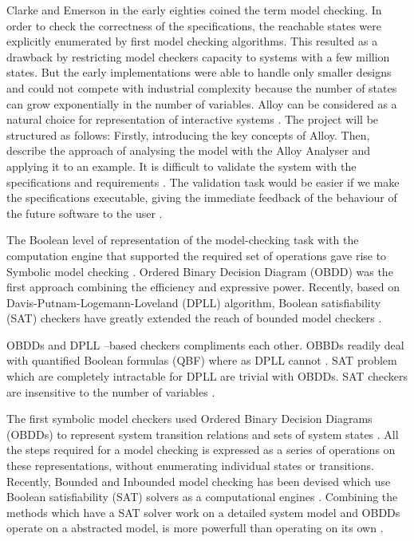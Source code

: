\documentclass[a4paper,12pt]{report}
\begin{document}
\begin{onehalfspacing}
Clarke and Emerson in the early eighties coined the term model checking. In order to check the correctness of the specifications, the reachable states were explicitly enumerated by first model checking algorithms. This resulted as a drawback by restricting model checkers capacity to systems with a few million states. But the early implementations were able to handle only smaller designs and could not compete with industrial complexity because the number of states can grow exponentially in the number of variables. Alloy can be considered as a natural choice for representation of interactive systems \cite{A.Blandford2000}. The project will be structured as follows:
Firstly, introducing the key concepts of Alloy. Then, describe the approach of analysing the model with the Alloy Analyser and applying it to an example. It is difficult to validate the system with the specifications and requirements \cite{RussellBoyatt}. The validation task would be easier if we make the specifications executable, giving the immediate feedback of the behaviour of the future software to the user \cite{RussellBoyatt}.

The Boolean level of representation of the model-checking task with the computation engine that supported the required set of operations gave rise to Symbolic model checking \cite{R.Bryant1986}. Ordered Binary Decision Diagram (OBDD) was the first approach combining the efficiency and expressive power. Recently, based on Davis-Putnam-Logemann-Loveland (DPLL) algorithm, Boolean satisfiability (SAT) checkers have greatly extended the reach of bounded model checkers \cite{R.Bryant1986}.

OBDDs and DPLL –based checkers compliments each other. OBBDs readily deal with quantified Boolean formulas (QBF) where as DPLL cannot \cite{R.Bryant1986}. SAT problem which are completely intractable for DPLL are trivial with OBDDs. SAT checkers are insensitive to the number of variables \cite{O.Strichman}.

The first symbolic model checkers used Ordered Binary Decision Diagrams (OBDDs) \cite{R.Bryant1986} to represent system transition relations and sets of system states \cite{McMillan1992} . All the steps required for a model checking is expressed as a series of operations on these representations, without enumerating individual states or transitions. Recently, Bounded and Inbounded model checking has been devised which use Boolean satisfiability (SAT) solvers as a computational engines \cite{McMillan1992}. Combining the methods which have a SAT solver work on a detailed system model and OBDDs operate on a abstracted model, is more powerfull than operating on its own \cite{Clarke1999}.


\end{onehalfspacing}
\end{document}

